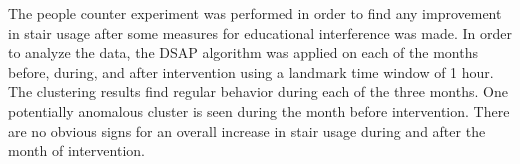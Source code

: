 The people counter experiment was performed in order to find any improvement in stair usage after some measures for educational interference was made. In order to analyze the data, the DSAP algorithm was applied on each of the months before, during, and after intervention using a landmark time window of 1 hour. The clustering results find regular behavior during each of the three months. One potentially anomalous cluster is seen during the month before intervention. There are no obvious signs for an overall increase in stair usage during and after the month of intervention.




















